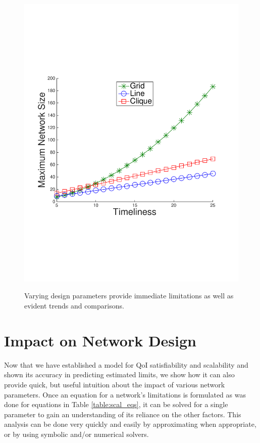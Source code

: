 \begin{figure}
{	\includegraphics[scale=0.22, clip=true, trim=14mm 65mm 23mm 65mm]{figures/use_cases_examples/cluster/num_nodes_vs_tness_cluster_color.pdf}
        \label{fig:use_case_num_nodes_vs_qoi_2}
        }
   \vspace{-1mm}
   \caption{Varying design parameters provide immediate limitations as well as evident trends and comparisons.}
   \label{fig:huh_net_design}
   \vspace{-6mm}
\end{figure}

\section{Impact on Network Design}
\label{sec:network_design}
Now that we have established a model for QoI satisfiability and scalability and shown its accuracy in predicting estimated limits, we show how it can also provide quick, but useful intuition about the impact of various network parameters.  Once an equation for a network's limitations is formulated as was done for equations in Table \ref{table:scal_eqs}, it can be solved for a single parameter to gain an understanding of its reliance on the other factors.  This analysis can be done very quickly and easily by approximating when appropriate, or by using symbolic and/or numerical solvers.  

